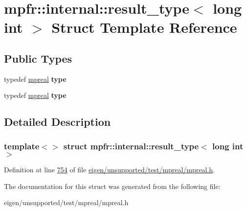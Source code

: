\hypertarget{structmpfr_1_1internal_1_1result__type_3_01long_01int_01_4}{}\section{mpfr\+:\+:internal\+:\+:result\+\_\+type$<$ long int $>$ Struct Template Reference}
\label{structmpfr_1_1internal_1_1result__type_3_01long_01int_01_4}
\subsection*{Public Types}
\begin{DoxyCompactItemize}
\item 
\mbox{\label{structmpfr_1_1internal_1_1result__type_3_01long_01int_01_4_a03e6287ca4dcd3357f5101859389ffa4}} 
typedef \hyperlink{classmpfr_1_1mpreal}{mpreal} {\bfseries type}
\item 
\mbox{\label{structmpfr_1_1internal_1_1result__type_3_01long_01int_01_4_a03e6287ca4dcd3357f5101859389ffa4}} 
typedef \hyperlink{classmpfr_1_1mpreal}{mpreal} {\bfseries type}
\end{DoxyCompactItemize}


\subsection{Detailed Description}
\subsubsection*{template$<$$>$\newline
struct mpfr\+::internal\+::result\+\_\+type$<$ long int $>$}



Definition at line \hyperlink{eigen_2unsupported_2test_2mpreal_2mpreal_8h_source_l00754}{754} of file \hyperlink{eigen_2unsupported_2test_2mpreal_2mpreal_8h_source}{eigen/unsupported/test/mpreal/mpreal.\+h}.



The documentation for this struct was generated from the following file\+:\begin{DoxyCompactItemize}
\item 
eigen/unsupported/test/mpreal/mpreal.\+h\end{DoxyCompactItemize}
